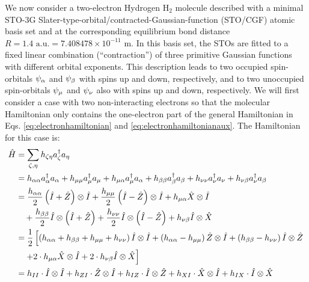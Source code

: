 \documentclass{aux/ttuthes2007}
\newcommand{\paren}[1]{\left( #1 \right)}
\newcommand{\anio}[1]{a_{\oo{#1}}}
\newcommand{\aniu}[1]{a_{\uo{#1}}}
\newcommand{\anig}[1]{a_{\go{#1}}}
\newcommand{\creo}[1]{a^\dagger_{\oo{#1}}}
\newcommand{\creu}[1]{a^\dagger_{\uo{#1}}}
\newcommand{\creg}[1]{a^\dagger_{\go{#1}}}
\newcommand{\uo}[1]{
		\IfEqCase{#1}{
			{0}{\mu}
			{1}{\nu}
			{2}{\xi}
		}[\PackageError{uo}{Undefined option to uo: #1}{}]
}
\newcommand{\oo}[1]{
		\IfEqCase{#1}{
			{0}{\alpha}
			{1}{\beta}
			{2}{\gamma}
		}[\PackageError{unocorb}{Undefined option to unuo: #1}{}]
}
\newcommand{\go}[1]{
		\IfEqCase{#1}{
			{0}{\zeta}
			{1}{\eta}
			{2}{\iota}
			{3}{\kappa}
		}[\PackageError{unocorb}{Undefined option to go: #1}{}]
}
\begin{document}
We now consider a two-electron Hydrogen $\text{H}_2$ molecule described with a minimal STO-3G Slater-type-orbital/contracted-Gaussian-function (STO/CGF) atomic basis set  and at the corresponding equilibrium bond distance $R = 1.4 \text{ a.u.} = 7.408478 \times 10^{-11} \text{ m}.$
In this basis set, the STOs are fitted to a fixed linear combination (“contraction”) of three primitive Gaussian functions with different orbital exponents. 
This description leads to two occupied spin-orbitals $\psi_{\oo 0}$ and $\psi_{\oo 1}$ with spins up and down, respectively, and to two unoccupied spin-orbitals $\psi_{\uo 0}$ and $\psi_{\uo 1}$ also with spins up and down, respectively.
We will first consider a case with two non-interacting electrons so that the molecular Hamiltonian only contains the one-electron part of the general Hamiltonian in Eqs. \ref{eq:electronhamiltonian} and \ref{eq:electronhamiltonianaux}. The Hamiltonian for this case is:
%
\begin{equation*}
	\begin{split}
	\hat H  &= \sum_{\go 0, \go 1}h_{\go 0 \go 1}\creg 0 \anig 1 \\
		&= {h_{\alpha\alpha}} \creo 0 \anio 0
		+ {h_{\mu\mu}} \creu 0 \aniu 0
		+ h_{\mu\alpha} \creu 0 \anio 0 
		+ {h_{\beta\beta}} \creo 1 \anio 1
		+ {h_{\nu\nu}} \creu 1 \aniu 1
		+ h_{\nu\beta} \creu 1 \anio 1
%
		\\
%
		&= \frac{h_{\alpha\alpha}}{2} \paren{\hat I + \hat Z} \otimes \hat I
		+ \frac{h_{\mu\mu}}{2} \paren{\hat I - \hat Z} \otimes \hat I
		+ h_{\mu\alpha} \hat X \otimes \hat I 
%
		\\
%
		& \quad
		+ \frac{h_{\beta\beta}}{2} \hat I \otimes \paren{\hat I + \hat Z} 
		+ \frac{h_{\nu\nu}}{2} \hat I \otimes \paren{\hat I - \hat Z} 
		+ h_{\nu\beta} \hat I \otimes \hat X
%
	\\
%
		&= 	\frac{1}{2} \left[ 
			\paren{h_{\alpha\alpha} + h_{\beta\beta} + h_{\mu\mu} + h_{\nu\nu}} \hat I \otimes \hat I 
		+	\paren{h_{\alpha\alpha} - h_{\mu\mu}} \hat Z \otimes \hat I 
		+	\paren{h_{\beta\beta} - h_{\nu\nu}} \hat I \otimes \hat Z 
	\right .
	\\
		& \quad	\left .
		+ 	2 \cdot h_{\mu\alpha} \hat X \otimes \hat I 
		+ 	2 \cdot h_{\nu\beta} \hat I \otimes \hat X
	\right]
%
	\\
%
		&=	h_{II} \cdot \hat I \otimes \hat I
		+	h_{ZI} \cdot \hat Z \otimes \hat I
		+	h_{IZ} \cdot \hat I \otimes \hat Z
		+	h_{XI} \cdot \hat X \otimes \hat I
		+	h_{IX} \cdot \hat I \otimes \hat X
	\end{split}
\end{equation*}
\end{document}
